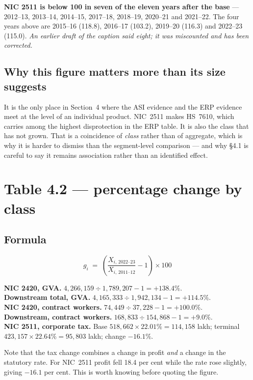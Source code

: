 \documentclass[11pt, a4paper]{article}
\begin{document}
\noindent \textbf{NIC 2511 is below 100 in seven of the eleven years after the base}
--- 2012--13, 2013--14, 2014--15, 2017--18, 2018--19, 2020--21 and 2021--22. The four
years above are 2015--16 (118.8), 2016--17 (103.2), 2019--20 (116.3) and 2022--23
(115.0). \emph{An earlier draft of the caption said eight; it was miscounted and has
been corrected.}

\subsection{Why this figure matters more than its size suggests}

It is the only place in Section~4 where the ASI evidence and the ERP evidence meet at
the level of an individual product. NIC~2511 makes HS~7610, which carries among the
highest disprotection in the ERP table. It is also the class that has not grown. That
is a coincidence of \emph{class} rather than of aggregate, which is why it is
harder to dismiss than the segment-level comparison --- and why §4.1 is careful to say
it remains association rather than an identified effect.

\section{Table 4.2 --- percentage change by class}

\subsection{Formula}
\[
g_i \;=\; \left( \frac{X_{i,\,2022\text{--}23}}{X_{i,\,2011\text{--}12}} - 1 \right) \times 100
\]

\begin{work}
\textbf{NIC 2420, GVA.} $4{,}266{,}159 \div 1{,}789{,}207 - 1 = +138.4\%$. \\
\textbf{Downstream total, GVA.} $4{,}165{,}333 \div 1{,}942{,}134 - 1 = +114.5\%$. \\
\textbf{NIC 2420, contract workers.} $74{,}449 \div 37{,}228 - 1 = +100.0\%$. \\
\textbf{Downstream, contract workers.} $168{,}833 \div 154{,}868 - 1 = +9.0\%$. \\
\textbf{NIC 2511, corporate tax.} Base $518{,}662 \times 22.01\% = 114{,}158$ lakh;
terminal $423{,}157 \times 22.64\% = 95{,}803$ lakh; change $-16.1\%$.
\end{work}

\noindent Note that the tax change combines a change in profit \emph{and} a change in
the statutory rate. For NIC~2511 profit fell 18.4 per cent while the rate rose
slightly, giving $-16.1$ per cent. This is worth knowing before quoting the figure.
\end{document}

